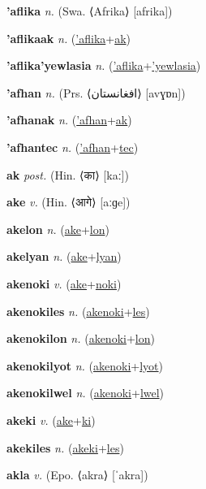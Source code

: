 \textbf{\hypertarget{'aflika}{'aflika}} \textit{n.} (Swa. ⟨Afrika⟩ [afrika])


\textbf{\hypertarget{'aflikaak}{'aflikaak}} \textit{n.} (\hyperlink{'aflika}{'aflika}+\allowbreak \hyperlink{ak}{ak})


\textbf{\hypertarget{'aflika'yewlasia}{'aflika'yewlasia}} \textit{n.} (\hyperlink{'aflika}{'aflika}+\allowbreak \hyperlink{'yewlasia}{'yewlasia})


\textbf{\hypertarget{'afhan}{'afhan}} \textit{n.} (Prs. ⟨{\arabics{}افغانستان‬}⟩ [avɣɒn])


\textbf{\hypertarget{'afhanak}{'afhanak}} \textit{n.} (\hyperlink{'afhan}{'afhan}+\allowbreak \hyperlink{ak}{ak})


\textbf{\hypertarget{'afhantec}{'afhantec}} \textit{n.} (\hyperlink{'afhan}{'afhan}+\allowbreak \hyperlink{tec}{tec})


\textbf{\hypertarget{ak}{ak}} \textit{post.} (Hin. ⟨{\devanagari{}का}⟩ [kaː])


\textbf{\hypertarget{ake}{ake}} \textit{v.} (Hin. ⟨{\devanagari{}आगे}⟩ [aːɡe])


\textbf{\hypertarget{akelon}{akelon}} \textit{n.} (\hyperlink{ake}{ake}+\allowbreak \hyperlink{lon}{lon})


\textbf{\hypertarget{akelyan}{akelyan}} \textit{n.} (\hyperlink{ake}{ake}+\allowbreak \hyperlink{lyan}{lyan})


\textbf{\hypertarget{akenoki}{akenoki}} \textit{v.} (\hyperlink{ake}{ake}+\allowbreak \hyperlink{noki}{noki})


\textbf{\hypertarget{akenokiles}{akenokiles}} \textit{n.} (\hyperlink{akenoki}{akenoki}+\allowbreak \hyperlink{les}{les})


\textbf{\hypertarget{akenokilon}{akenokilon}} \textit{n.} (\hyperlink{akenoki}{akenoki}+\allowbreak \hyperlink{lon}{lon})


\textbf{\hypertarget{akenokilyot}{akenokilyot}} \textit{n.} (\hyperlink{akenoki}{akenoki}+\allowbreak \hyperlink{lyot}{lyot})


\textbf{\hypertarget{akenokilwel}{akenokilwel}} \textit{n.} (\hyperlink{akenoki}{akenoki}+\allowbreak \hyperlink{lwel}{lwel})


\textbf{\hypertarget{akeki}{akeki}} \textit{v.} (\hyperlink{ake}{ake}+\allowbreak \hyperlink{ki}{ki})


\textbf{\hypertarget{akekiles}{akekiles}} \textit{n.} (\hyperlink{akeki}{akeki}+\allowbreak \hyperlink{les}{les})


\textbf{\hypertarget{akla}{akla}} \textit{v.} (Epo. ⟨akra⟩ [ˈakra])


